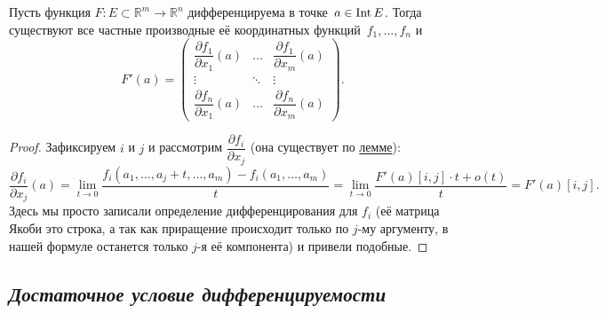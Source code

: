 \begin{theorem}
	Пусть функция \(F \colon E \subset \mathbb{R}^m \to \mathbb{R}^n\) дифференцируема в точке~\(a \in \operatorname{Int} E\). Тогда существуют все частные производные её координатных функций~\(f_1, \ldots, f_n\) и \[
		F'(a) = \begin{pmatrix}
			\dfrac{\partial f_1}{\partial x_1}(a) & \dots & \dfrac{\partial f_1}{\partial x_m}(a)\\
			\vdots & \ddots & \vdots \\
			\dfrac{\partial f_n}{\partial x_1}(a) & \dots & \dfrac{\partial f_n}{\partial x_m}(a)
		\end{pmatrix}.
	\]
\end{theorem}
\begin{proof}
	Зафиксируем \(i\) и \(j\) и рассмотрим \(\dfrac{\partial f_i}{\partial x_j}\) (она существует по \hyperlink{t75}{лемме}): \[
		\frac{\partial f_i}{\partial x_j}(a) = \lim_{t \to 0} \frac{f_i (a_1, \ldots, a_j + t, \ldots, a_m) - f_i (a_1, \ldots, a_m)}{t} = \lim_{t \to 0} \frac{F'(a)[i,j] \cdot t + o(t)}{t} = F'(a)[i,j].
	\]
	Здесь мы просто записали определение дифференцирования для \(f_i\) (её матрица Якоби это строка, а так как приращение происходит только по \(j\)-му аргументу, в нашей формуле останется только \(j\)-я её компонента) и привели подобные.
\end{proof}

\subsection{\itshape Достаточное условие дифференцируемости}

